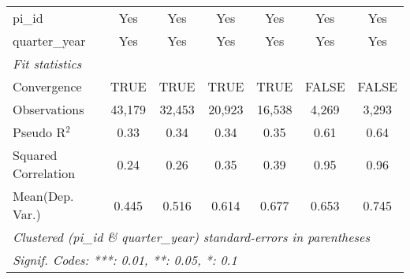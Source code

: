 \begin{tabular}{lcccccc}
   pi\_id                                                     & Yes          & Yes          & Yes           & Yes           & Yes           & Yes\\  
   quarter\_year                                              & Yes          & Yes          & Yes           & Yes           & Yes           & Yes\\  
   \midrule
   \emph{Fit statistics}\\
   Convergence                                                &TRUE          & TRUE         & TRUE          & TRUE          & FALSE         & FALSE\\  
   Observations                                               & 43,179       & 32,453       & 20,923        & 16,538        & 4,269         & 3,293\\  
   Pseudo R$^2$                                               & 0.33         & 0.34         & 0.34          & 0.35          & 0.61          & 0.64\\  
   Squared Correlation                                        & 0.24         & 0.26         & 0.35          & 0.39          & 0.95          & 0.96\\  
Mean(Dep. Var.) & 0.445 & 0.516 & 0.614 & 0.677 & 0.653 & 0.745 \\
   \midrule \midrule
   \multicolumn{7}{l}{\emph{Clustered (pi\_id \& quarter\_year) standard-errors in parentheses}}\\
   \multicolumn{7}{l}{\emph{Signif. Codes: ***: 0.01, **: 0.05, *: 0.1}}\\
\end{tabular}
\par\endgroup
